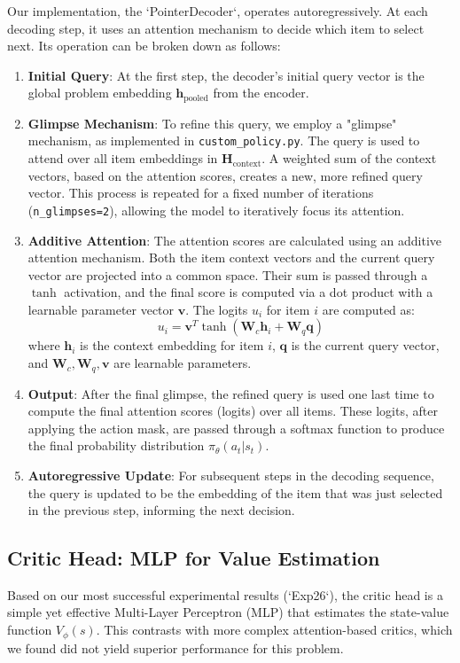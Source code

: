Our implementation, the `PointerDecoder`, operates autoregressively. At each decoding step, it uses an attention mechanism to decide which item to select next. Its operation can be broken down as follows:
\begin{enumerate}
    \item \textbf{Initial Query}: At the first step, the decoder's initial query vector is the global problem embedding \(\mathbf{h}_{\text{pooled}}\) from the encoder.
    \item \textbf{Glimpse Mechanism}: To refine this query, we employ a "glimpse" mechanism, as implemented in \texttt{custom\_policy.py}. The query is used to attend over all item embeddings in \(\mathbf{H}_{\text{context}}\). A weighted sum of the context vectors, based on the attention scores, creates a new, more refined query vector. This process is repeated for a fixed number of iterations (\texttt{n\_glimpses=2}), allowing the model to iteratively focus its attention.
    \item \textbf{Additive Attention}: The attention scores are calculated using an additive attention mechanism. Both the item context vectors and the current query vector are projected into a common space. Their sum is passed through a \(\tanh\) activation, and the final score is computed via a dot product with a learnable parameter vector \(\mathbf{v}\). The logits \(u_i\) for item \(i\) are computed as:
    \[ u_i = \mathbf{v}^T \tanh(\mathbf{W}_c \mathbf{h}_i + \mathbf{W}_q \mathbf{q}) \]
    where \(\mathbf{h}_i\) is the context embedding for item \(i\), \(\mathbf{q}\) is the current query vector, and \(\mathbf{W}_c, \mathbf{W}_q, \mathbf{v}\) are learnable parameters.
    \item \textbf{Output}: After the final glimpse, the refined query is used one last time to compute the final attention scores (logits) over all items. These logits, after applying the action mask, are passed through a softmax function to produce the final probability distribution \(\pi_\theta(a_t|s_t)\).
    \item \textbf{Autoregressive Update}: For subsequent steps in the decoding sequence, the query is updated to be the embedding of the item that was just selected in the previous step, informing the next decision.
\end{enumerate}

\subsection{Critic Head: MLP for Value Estimation}
Based on our most successful experimental results (`Exp26`), the critic head is a simple yet effective Multi-Layer Perceptron (MLP) that estimates the state-value function \(V_\phi(s)\). This contrasts with more complex attention-based critics, which we found did not yield superior performance for this problem.

